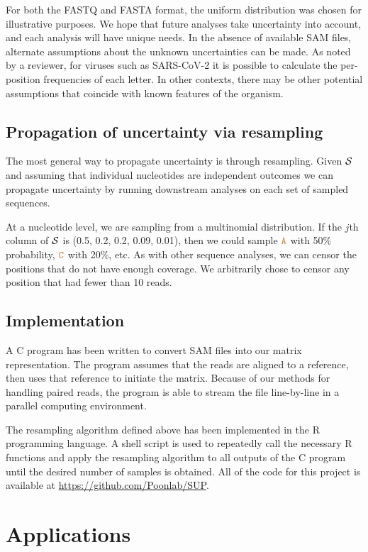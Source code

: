 \documentclass[12pt]{article}
\begin{document}
For both the FASTQ and FASTA format, the uniform distribution was chosen for illustrative purposes.
We hope that future analyses take uncertainty into account, and each analysis will have unique needs.
In the absence of available SAM files, alternate assumptions about the unknown uncertainties can be made.
As noted by a reviewer, for viruses such as SARS-CoV-2 it is possible to calculate the per-position frequencies of each letter.
In other contexts, there may be other potential assumptions that coincide with known features of the organism.


\subsection{Propagation of uncertainty via resampling}

The most general way to propagate uncertainty is through resampling.
Given $\mathcal{S}$ and assuming that individual nucleotides are independent outcomes we can propagate uncertainty by running downstream analyses on each set of sampled sequences.

At a nucleotide level, we are sampling from a multinomial distribution.
If the $j$th column of $\mathcal{S}$ is (0.5, 0.2, 0.2, 0.09, 0.01), then we could sample $\texttt{\textcolor{brown}{A}}$ with 50\% probability, $\texttt{\textcolor{brown}{C}}$ with 20\%, etc.
As with other sequence analyses, we can censor the positions that do not have enough coverage.
We arbitrarily chose to censor any position that had fewer than 10 reads.

\subsection{Implementation}

A C program has been written to convert SAM files into our matrix representation.
The program assumes that the reads are aligned to a reference, then uses that reference to initiate the matrix.
Because of our methods for handling paired reads, the program is able to stream the file line-by-line in a parallel computing environment.

The resampling algorithm defined above has been implemented in the R programming language.
A shell script is used to repeatedly call the necessary R functions and apply the resampling algorithm to all outputs of the C program until the desired number of samples is obtained.
All of the code for this project is available at \url{https://github.com/Poonlab/SUP}.

\section{Applications}
\end{document}
